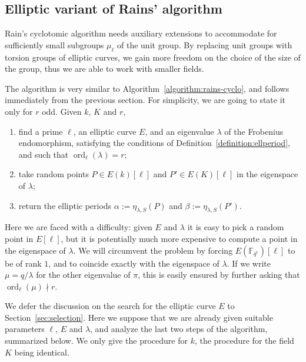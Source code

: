 \documentclass{mcom-l}
\theoremstyle{plain}
\theoremstyle{definition}
\DeclareMathOperator{\order}{ord} %
\newcommand{\F}{\ensuremath{\mathbb{F}}}
\newcounter{algorithm}
\begin{document}
\subsection{Elliptic variant of Rains' algorithm}

Rain's cyclotomic algorithm needs auxiliary extensions to accommodate
for sufficiently small subgroups $\mu_\ell$ of the unit group. By
replacing unit groups with torsion groups of elliptic curves, we gain
more freedom on the choice of the size of the group, thus we are able
to work with smaller fields.  

The algorithm is very similar to
Algorithm~\ref{algorithm:rains-cyclo}, and follows immediately from
the previous section. For simplicity, we are going to state it only
for $r$ odd. Given $k$, $K$ and $r$,
\begin{enumerate}
\item find a prime $\ell$, an elliptic curve $E$, and an eigenvalue
  $\lambda$ of the Frobenius endomorphism, satisfying the conditions
  of Definition~\ref{definition:ellperiod}, and such that
  $\order_\ell(\lambda)=r$;
\item take random points $P\in E(k)[\ell]$ and $P'\in E(K)[\ell]$ in
  the eigenspace of $\lambda$;
\item return the elliptic periods $\alpha := \eta_{\lambda,S}(P)$ and
  $\beta:= \eta_{\lambda,S}(P')$.
\end{enumerate}

Here we are faced with a difficulty: given $E$ and $\lambda$ it is
easy to pick a random point in $E[\ell]$, but it is potentially much
more expensive to compute a point in the eigenspace of $\lambda$. We
will circumvent the problem by forcing $E(\F_{q^r})[\ell]$ to be of
rank $1$, and to coincide exactly with the eigenspace of $\lambda$.
If we write $\mu = q/\lambda$ for the other eigenvalue of $\pi$, this
is easily ensured by further asking that $\order_\ell(\mu) \nmid r$.

We defer the discussion on the search for the elliptic curve $E$ to
Section~\ref{sec:selection}. Here we suppose that we are already given
suitable parameters $\ell$, $E$ and $\lambda$, and analyze the last
two steps of the algorithm, summarized below.  We only give the
procedure for $k$, the procedure for the field $K$ being
identical.
\end{document}
